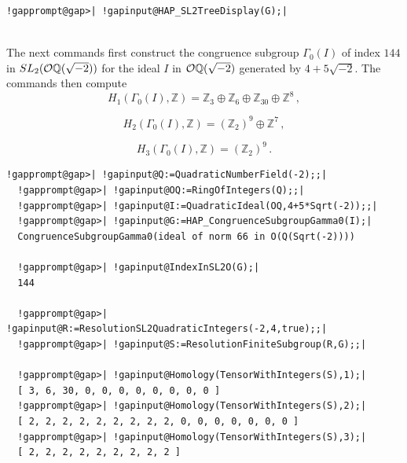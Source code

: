 \documentclass[a4paper,11pt]{report}
\begin{document}
{{\begin{Verbatim}[commandchars=!@|,fontsize=\small,frame=single,label=Example]
  !gapprompt@gap>| !gapinput@HAP_SL2TreeDisplay(G);|
  
\end{Verbatim}
  

The next commands first construct the congruence subgroup $\Gamma_0(I)$ of index $144$ in $SL_2({\cal O}\mathbb Q(\sqrt{-2}))$ for the ideal $I$ in ${\cal O}\mathbb Q(\sqrt{-2})$ generated by $4+5\sqrt{-2}$. The commands then compute 
\[H_1(\Gamma_0(I),\mathbb Z) = \mathbb Z_3 \oplus \mathbb Z_6 \oplus \mathbb
Z_{30} \oplus \mathbb Z^8\, ,\]
 
\[H_2(\Gamma_0(I), \mathbb Z) = (\mathbb Z_2)^9 \oplus \mathbb Z^7\, ,\]
 
\[H_3(\Gamma_0(I), \mathbb Z) = (\mathbb Z_2)^9 \, .\]
 
\begin{Verbatim}[commandchars=!@|,fontsize=\small,frame=single,label=Example]
  !gapprompt@gap>| !gapinput@Q:=QuadraticNumberField(-2);;|
  !gapprompt@gap>| !gapinput@OQ:=RingOfIntegers(Q);;|
  !gapprompt@gap>| !gapinput@I:=QuadraticIdeal(OQ,4+5*Sqrt(-2));;|
  !gapprompt@gap>| !gapinput@G:=HAP_CongruenceSubgroupGamma0(I);|
  CongruenceSubgroupGamma0(ideal of norm 66 in O(Q(Sqrt(-2)))) 
  
  !gapprompt@gap>| !gapinput@IndexInSL2O(G);|
  144
  
  !gapprompt@gap>| !gapinput@R:=ResolutionSL2QuadraticIntegers(-2,4,true);;|
  !gapprompt@gap>| !gapinput@S:=ResolutionFiniteSubgroup(R,G);;|
  
  !gapprompt@gap>| !gapinput@Homology(TensorWithIntegers(S),1);|
  [ 3, 6, 30, 0, 0, 0, 0, 0, 0, 0, 0 ]
  !gapprompt@gap>| !gapinput@Homology(TensorWithIntegers(S),2);|
  [ 2, 2, 2, 2, 2, 2, 2, 2, 2, 0, 0, 0, 0, 0, 0, 0 ]
  !gapprompt@gap>| !gapinput@Homology(TensorWithIntegers(S),3);|
  [ 2, 2, 2, 2, 2, 2, 2, 2, 2 ]
  
\end{Verbatim}
 }

 
}
\end{document}
